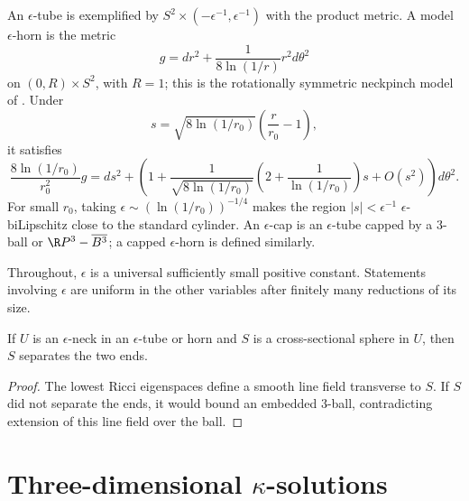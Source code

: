 An $\epsilon$-tube is exemplified by
$S^2\times(-\epsilon^{-1},\epsilon^{-1})$ with the product metric. A model
$\epsilon$-horn is the metric
\begin{equation}
g=dr^2+\frac{1}{8\ln(1/r)}r^2d\theta^2
\end{equation}
on $(0,R)\times S^2$, with $R=1$; this is the rotationally symmetric
neckpinch model of \cite{Angenent-Knopf}. Under
\[
s=\sqrt{8\ln(1/r_0)}\left(\frac r{r_0}-1\right),
\]
it satisfies
\begin{equation}
\frac{8\ln(1/r_0)}{r_0^2}g
=ds^2+\left(1+\frac{1}{\sqrt{8\ln(1/r_0)}}
\left(2+\frac{1}{\ln(1/r_0)}\right)s+O(s^2)\right)d\theta^2.
\end{equation}
For small $r_0$, taking
$\epsilon\sim(\ln(1/r_0))^{-1/4}$ makes the region
$|s|<\epsilon^{-1}$ $\epsilon$-biLipschitz close to the standard cylinder.
An $\epsilon$-cap is an $\epsilon$-tube capped by a $3$-ball or
$\R P^3-\overline{B^3}$; a capped $\epsilon$-horn is defined similarly.

\begin{remark}
  \label{rem:kl-notation-terminology-positivity-notation-terminology}

\label{remepsilon}
Throughout, $\epsilon$ is a universal sufficiently small positive constant.
Statements involving $\epsilon$ are uniform in the other variables after
finitely many reductions of its size.
\end{remark}

\begin{lemma}
  \label{lem:kl-notation-terminology-neck-geometry-lemma}

If $U$ is an $\epsilon$-neck in an $\epsilon$-tube or horn and $S$ is a
cross-sectional sphere in $U$, then $S$ separates the two ends.
\end{lemma}
\begin{proof}
\sketch The lowest Ricci eigenspaces define a smooth line field transverse to
$S$. If $S$ did not separate the ends, it would bound an embedded $3$-ball,
contradicting extension of this line field over the ball.
\end{proof}

\section{Three-dimensional $\kappa$-solutions}
 \label{II.1}


